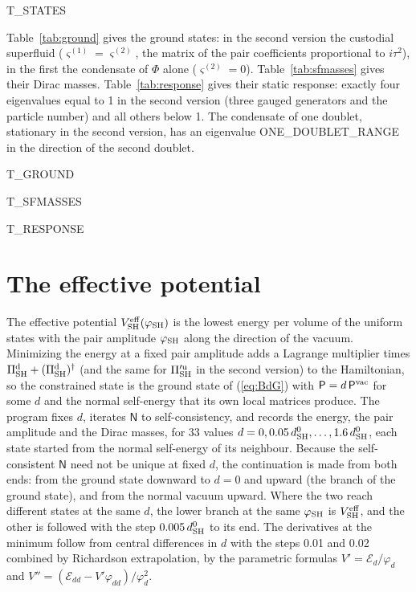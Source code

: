 \documentclass[aps,prd,onecolumn,superscriptaddress,nofootinbib,floatfix,longbibliography]{revtex4-2}
\newcommand{\SH}{{\rm SH}}
\begin{document}
{{T_STATES}}

Table~\ref{tab:ground} gives the ground states: in the second version the custodial superfluid
($\varsigma^{(1)}=\varsigma^{(2)}$, the matrix of the pair coefficients proportional to $i\tau^2$), in the first the
condensate of $\Phi$ alone ($\varsigma^{(2)}=0$). Table~\ref{tab:sfmasses} gives their Dirac masses. Table~\ref{tab:response}
gives their static response: exactly four eigenvalues equal to 1 in the second version (three gauged generators and the
particle number) and all others below 1. The condensate of one doublet, stationary in the second version, has an
eigenvalue {{ONE_DOUBLET_RANGE}} in the direction of the second doublet.

{{T_GROUND}}

{{T_SFMASSES}}

{{T_RESPONSE}}

\section{The effective potential}
\label{sec:potential}

The effective potential $V^{\rm eff}_\SH(\varphi_\SH)$ is the lowest energy per volume of the uniform states with the pair
amplitude $\varphi_\SH$ along the direction of the vacuum. Minimizing the energy at a fixed pair amplitude adds a Lagrange
multiplier times $\Pi^{\rm d}_\SH+(\Pi^{\rm d}_\SH)^\dagger$ (and the same for $\Pi'^{\rm u}_\SH$ in the second version) to the
Hamiltonian, so the constrained state is the ground state of (\ref{eq:BdG}) with $\mathsf P=d\,\mathsf P^{\rm vac}$ for some
$d$ and the normal self-energy that its own local matrices produce. The program fixes $d$, iterates $\mathsf N$ to
self-consistency, and records the energy, the pair amplitude and the Dirac masses, for 33 values
$d=0,0.05\,d^0_\SH,\dots,1.6\,d^0_\SH$, each state started from the normal self-energy of its neighbour. Because the
self-consistent $\mathsf N$ need not be unique at fixed $d$, the continuation is made from both ends: from the ground state
downward to $d=0$ and upward (the branch of the ground state), and from the normal vacuum upward. Where the two reach
different states at the same $d$, the lower branch at the same $\varphi_\SH$ is $V^{\rm eff}_\SH$, and the other is followed
with the step $0.005\,d^0_\SH$ to its end. The derivatives at the minimum follow from central differences in $d$ with the
steps 0.01 and 0.02 combined by Richardson extrapolation, by the parametric formulas
$V'=\mathcal E_d/\varphi_d$ and $V''=(\mathcal E_{dd}-V'\varphi_{dd})/\varphi_d^2$.
\end{document}
